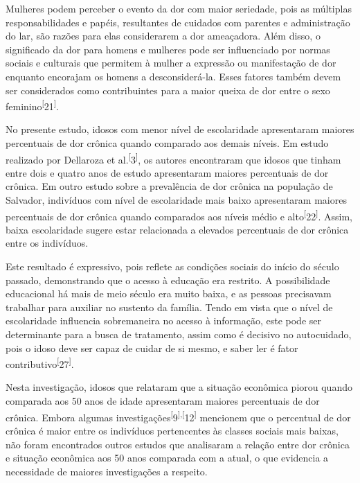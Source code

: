 \documentclass{article}
\begin{document}
Mulheres podem perceber o evento da dor com maior seriedade, pois as múltiplas
responsabilidades e papéis, resultantes de cuidados com parentes e administração
do lar, são razões para elas considerarem a dor ameaçadora. Além disso, o
significado da dor para homens e mulheres pode ser influenciado por normas
sociais e culturais que permitem à mulher a expressão ou manifestação de dor
enquanto encorajam os homens a desconsiderá-la. Esses fatores também devem ser
considerados como contribuintes para a maior queixa de dor entre o sexo
feminino\textsuperscript{[}21\textsuperscript{]}.

No presente estudo, idosos com menor nível de escolaridade apresentaram maiores
percentuais de dor crônica quando comparado aos demais níveis. Em estudo
realizado por Dellaroza et al.\textsuperscript{[}3\textsuperscript{]}, os autores encontraram que idosos que tinham entre dois e quatro anos de
estudo apresentaram maiores percentuais de dor crônica. Em outro estudo sobre a
prevalência de dor crônica na população de Salvador, indivíduos com nível de
escolaridade mais baixo apresentaram maiores percentuais de dor crônica quando
comparados aos níveis médio e alto\textsuperscript{[}22\textsuperscript{]}. Assim, baixa escolaridade sugere estar relacionada a elevados percentuais de
dor crônica entre os indivíduos.

Este resultado é expressivo, pois reflete as condições sociais do início do
século passado, demonstrando que o acesso à educação era restrito. A
possibilidade educacional há mais de meio século era muito baixa, e as pessoas
precisavam trabalhar para auxiliar no sustento da família. Tendo em vista que o
nível de escolaridade influencia sobremaneira no acesso à informação, este pode
ser determinante para a busca de tratamento, assim como é decisivo no
autocuidado, pois o idoso deve ser capaz de cuidar de si mesmo, e saber ler é
fator contributivo\textsuperscript{[}27\textsuperscript{]}.

Nesta investigação, idosos que relataram que a situação econômica piorou quando
comparada aos 50 anos de idade apresentaram maiores percentuais de dor crônica.
Embora algumas investigações\textsuperscript{[}9\textsuperscript{]}\textsuperscript{,}\textsuperscript{[}12\textsuperscript{]}
mencionem que o percentual de dor crônica é maior entre os indivíduos
pertencentes às classes sociais mais baixas, não foram encontrados outros
estudos que analisaram a relação entre dor crônica e situação econômica aos 50
anos comparada com a atual, o que evidencia a necessidade de maiores
investigações a respeito.
\end{document}
